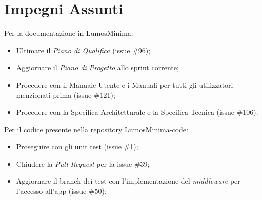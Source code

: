 \documentclass[a4paper, 12pt]{article}
\begin{document}
\section*{Impegni Assunti}

Per la documentazione in LumosMinima:
\begin{itemize}
    \item Ultimare il \textit{Piano di Qualifica} (issue \#96);
    \item Aggiornare il \textit{Piano di Progetto} allo sprint corrente;
    \item Procedere con il Manuale Utente e i Manuali per tutti gli utilizzatori
          menzionati prima (issue \#121);
    \item Procedere con la Specifica Architetturale e la Specifica Tecnica
          (issue \#106).
\end{itemize}
\vspace*{0.5cm}
Per il codice presente nella repository LumosMinima-code:
\begin{itemize}
    \item Proseguire con gli unit test (issue \#1);
    \item Chiudere la \textit{Pull Request} per la issue \#39;
    \item Aggiornare il branch dei test con l'implementazione del
          \textit{middleware} per l'accesso all'app (issue \#50);
\end{itemize}
\end{document}
